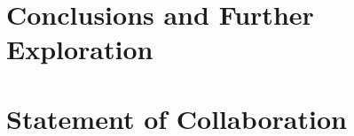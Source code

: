 \documentclass[11pt,a4paper]{article}
\begin{document}
\section{Conclusions and Further Exploration}%
\label{sec:conclusion_and_further_exploration}






\appendix


\section{Statement of Collaboration}
\end{document}
